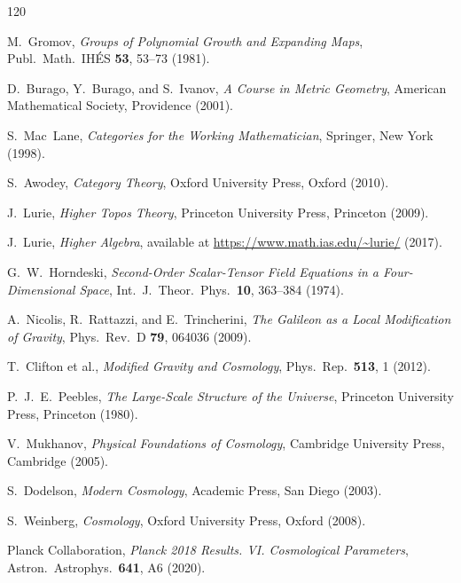 \documentclass[12pt,a4paper]{article}
\begin{document}
\begin{thebibliography}{120}

M.~Gromov,
\textit{Groups of Polynomial Growth and Expanding Maps},
Publ.\ Math.\ IH\'ES \textbf{53}, 53--73 (1981).

D.~Burago, Y.~Burago, and S.~Ivanov,
\textit{A Course in Metric Geometry},
American Mathematical Society, Providence (2001).


S.~Mac~Lane,
\textit{Categories for the Working Mathematician},
Springer, New York (1998).

S.~Awodey,
\textit{Category Theory},
Oxford University Press, Oxford (2010).

J.~Lurie,
\textit{Higher Topos Theory},
Princeton University Press, Princeton (2009).

J.~Lurie,
\textit{Higher Algebra},
available at \url{https://www.math.ias.edu/~lurie/} (2017).


G.~W.~Horndeski,
\textit{Second-Order Scalar-Tensor Field Equations in a
Four-Dimensional Space},
Int.\ J.\ Theor.\ Phys.\ \textbf{10}, 363--384 (1974).

A.~Nicolis, R.~Rattazzi, and E.~Trincherini,
\textit{The Galileon as a Local Modification of Gravity},
Phys.\ Rev.\ D \textbf{79}, 064036 (2009).

T.~Clifton et al.,
\textit{Modified Gravity and Cosmology},
Phys.\ Rep.\ \textbf{513}, 1 (2012).


P.~J.~E.~Peebles,
\textit{The Large-Scale Structure of the Universe},
Princeton University Press, Princeton (1980).

V.~Mukhanov,
\textit{Physical Foundations of Cosmology},
Cambridge University Press, Cambridge (2005).

S.~Dodelson,
\textit{Modern Cosmology},
Academic Press, San Diego (2003).

S.~Weinberg,
\textit{Cosmology},
Oxford University Press, Oxford (2008).


Planck Collaboration,
\textit{Planck 2018 Results. VI. Cosmological Parameters},
Astron.\ Astrophys.\ \textbf{641}, A6 (2020).


\end{thebibliography}
\end{document}
